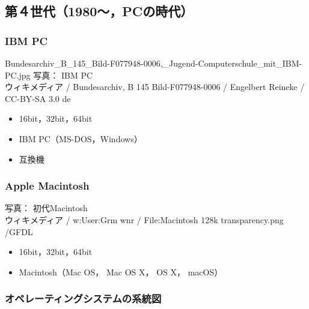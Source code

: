 \documentclass[unicode]{beamer}                   %
\begin{document}
\subsection{第４世代（1980〜，PCの時代）}
\begin{frame}
  \frametitle{IBM PC}
{Bundesarchiv_B_145_Bild-F077948-0006,_Jugend-Computerschule_mit_IBM-PC.jpg}
      {\tiny
          写真： IBM PC \\
          ウィキメディア /
          Bundesarchiv, B 145 Bild-F077948-0006 /
          Engelbert Reineke / CC-BY-SA 3.0 de
      }
  \begin{itemize}
    \item 16bit，32bit，64bit
    \item IBM PC（MS-DOS，Windows）
    \item 互換機
  \end{itemize}
\end{frame}

\begin{frame}
  \frametitle{Apple Macintosh}
      {\tiny
          写真： 初代Macintosh \\
          ウィキメディア / w:User:Grm wnr / 
          File:Macintosh 128k transparency.png /GFDL
      }
  \begin{itemize}
    \item 16bit，32bit，64bit
    \item Macintosh（Mac OS， Mac OS X， OS X， macOS）
  \end{itemize}
\end{frame}

\begin{frame}
  \frametitle{オペレーティングシステムの系統図}
\end{frame}
\end{document}
